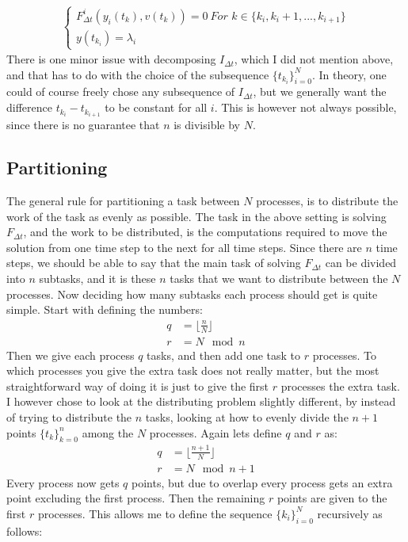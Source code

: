 \begin{align*}
\left\{
     \begin{array}{lr}
		F_{\Delta t}^i(y_i(t_k),v(t_k))=0 \	\textit{For $k \in \{k_i,k_i+1,...,k_{i+1} \}$} \\
		y(t_{k_i})=\lambda_i
	\end{array}
   \right.	
\end{align*} 
There is one minor issue with decomposing $I_{\Delta t}$, which I did not mention above, and that has to do with the choice of the subsequence $\{t_{k_i}\}_{i=0}^N$. In theory, one could of course freely chose any subsequence of $I_{\Delta t}$, but we generally want the difference $t_{k_i} -t_{k_{i+1}}$ to be constant for all $i$. This is however not always possible, since there is no guarantee that $n$ is divisible by $N$.
\subsection{Partitioning}
The general rule for partitioning a task between $N$ processes, is to distribute the work of the task as evenly as possible. The task in the above setting is solving $ F_{\Delta t}$, and the work to be distributed, is the computations required to move the solution from one time step to the next for all time steps. Since there are $n$ time steps, we should be able to say that the main task of solving $F_{\Delta t}$ can be divided into $n$ subtasks, and it is these $n$ tasks that we want to distribute between the $N$ processes. Now deciding how many subtasks each process should get is quite simple. Start with defining the numbers:
\begin{align*}
q &= \lfloor \frac{n}{N}\rfloor \\
r &= N \mod n
\end{align*} 
Then we give each process $q$ tasks, and then add one task to $r$ processes. To which processes you give the extra task does not really matter, but the most straightforward way of doing it is just to give the first $r$ processes the extra task. I however chose to look at the distributing problem slightly different, by instead of trying to distribute the $n$ tasks, looking at how to evenly divide the $n+1$ points $\{t_k\}_{k=0}^{n}$ among the $N$ processes. Again lets define $q$ and $r$ as:
\begin{align*}
q &= \lfloor \frac{n+1}{N}\rfloor \\
r &= N \mod n+1
\end{align*}
Every process now gets $q$ points, but due to overlap every process gets an extra point excluding the first process. Then the remaining $r$ points are given to the first $r$ processes. This allows me to define the sequence $\{k_{i}\}_{i=0}^N$ recursively as follows:
